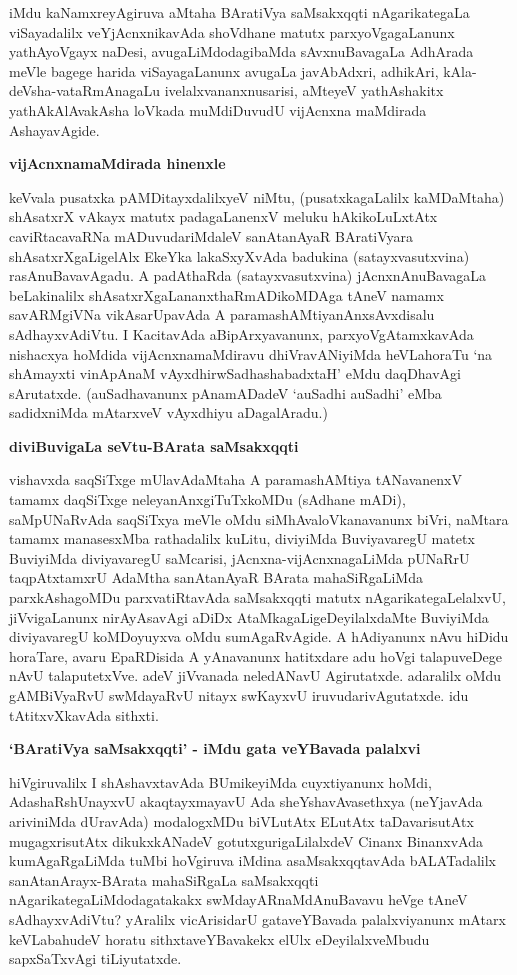 iMdu kaNamxreyAgiruva aMtaha BAratiVya saMsakxqqti nAgarikategaLa viSayadalilx veYjAcnxnikavAda shoVdhane matutx parxyoVgagaLanunx yathAyoVgayx naDesi, avugaLiMdodagibaMda sAvxnuBavagaLa AdhArada meVle bagege harida viSayagaLanunx avugaLa javAbAdxri, adhikAri, kAla-deVsha-vataRmAnagaLu ivelalxvananxnusarisi, aMteyeV yathAshakitx yathAkAlAvakAsha loVkada muMdiDuvudU vijAcnxna maMdirada AshayavAgide.

\noindent
\textbf{vijAcnxnamaMdirada hinenxle}

keVvala pusatxka pAMDitayxdalilxyeV niMtu, (pusatxkagaLalilx kaMDaMtaha) shAsatxrX vAkayx matutx padagaLanenxV meluku hAkikoLuLxtAtx caviRtacavaRNa mADuvudariMdaleV sanAtanAyaR BAratiVyara shAsatxrXgaLigelAlx EkeYka lakaSxyXvAda badukina (satayxvasutxvina) rasAnuBavavAgadu. A padAthaRda (satayxvasutxvina) jAcnxnAnuBavagaLa beLakinalilx shAsatxrXgaLananxthaRmADikoMDAga tAneV namamx 
savARMgiVNa vikAsarUpavAda A paramashAMtiyanAnxsAvxdisalu sAdhayxvAdiVtu. I KacitavAda aBipArxyavanunx, parxyoVgAtamxkavAda nishacxya hoMdida vijAcnxnamaMdiravu dhiVravANiyiMda heVLahoraTu `na shAmayxti vinApAnaM vAyxdhirwSadhashabadxtaH'\label{25} eMdu daqDhavAgi sArutatxde. (auSadhavanunx pAnamADadeV `auSadhi auSadhi' eMba sadidxniMda mAtarxveV vAyxdhiyu aDagalAradu.)

\noindent
\textbf{diviBuvigaLa seVtu-BArata saMsakxqqti}\label{page23}

vishavxda saqSiTxge mUlavAdaMtaha A paramashAMtiya tANavanenxV tamamx daqSiTxge neleyanAnxgiTuTxkoMDu (sAdhane mADi), saMpUNaRvAda saqSiTxya meVle oMdu siMhAvaloVkanavanunx biVri, naMtara tamamx manasesxMba rathadalilx kuLitu, diviyiMda BuviyavaregU matetx BuviyiMda diviyavaregU saMcarisi, jAcnxna-vijAcnxnagaLiMda pUNaRrU taqpAtxtamxrU AdaMtha sanAtanAyaR BArata mahaSiRgaLiMda parxkAshagoMDu parxvatiRtavAda saMsakxqqti matutx nAgarikategaLelalxvU, jiVvigaLanunx nirAyAsavAgi aDiDx AtaMkagaLigeDeyilalxdaMte BuviyiMda diviyavaregU koMDoyuyxva oMdu sumAgaRvAgide. A hAdiyanunx nAvu hiDidu horaTare, avaru EpaRDisida A yAnavanunx hatitxdare adu hoVgi talapuveDege nAvU talaputetxVve. adeV jiVvanada neledANavU Agirutatxde. adaralilx oMdu gAMBiVyaRvU swMdayaRvU nitayx swKayxvU iruvudarivAgutatxde. idu tAtitxvXkavAda sithxti.

\noindent
\textbf{`BAratiVya saMsakxqqti' - iMdu gata veYBavada palalxvi}\label{page23}

hiVgiruvalilx I shAshavxtavAda BUmikeyiMda cuyxtiyanunx hoMdi, AdashaRshUnayxvU akaqtayxmayavU Ada sheYshavAvasethxya (neYjavAda ariviniMda dUravAda) modalogxMDu biVLutAtx ELutAtx taDavarisutAtx mugagxrisutAtx dikukxkANadeV gotutxgurigaLilalxdeV Cinanx BinanxvAda kumAgaRgaLiMda tuMbi hoVgiruva iMdina asaMsakxqqtavAda bALATadalilx sanAtanArayx-BArata mahaSiRgaLa saMsakxqqti nAgarikategaLiMdodagatakakx swMdayARnaMdAnuBavavu heVge tAneV sAdhayxvAdiVtu? yAralilx vicArisidarU gataveYBavada palalxviyanunx mAtarx keVLabahudeV horatu sithxtaveYBavakekx elUlx eDeyilalxveMbudu sapxSaTxvAgi tiLiyutatxde.

